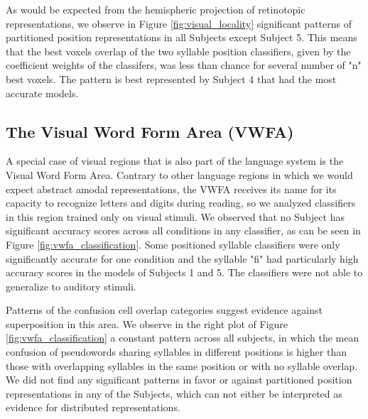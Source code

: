 As would be expected from the hemispheric projection of retinotopic representations, we observe in Figure \ref{fig:visual_locality} significant patterns of partitioned position representations in all Subjects except Subject 5.
This means that the best voxels overlap of the two syllable position classifiers, given by the coefficient weights of the classifers, was less than chance for several number of "n" best voxels.
The pattern is best represented by Subject 4 that had the most accurate models.


\subsection{The Visual Word Form Area (VWFA)}

A special case of visual regions that is also part of the language system is the Visual Word Form Area.
Contrary to other language regions in which we would expect abstract amodal representations, the VWFA receives its name for its capacity to recognize letters and digits during reading, so we analyzed classifiers in this region trained only on visual stimuli.
We observed that no Subject has significant accuracy scores across all conditions in any classifier, as can be seen in Figure \ref{fig:vwfa_classification}.
Some positioned syllable classifiers were only significantly accurate for one condition and the syllable "fi" had particularly high accuracy scores in the models of Subjects 1 and 5.
The classifiers were not able to generalize to auditory stimuli.

Patterns of the confusion cell overlap categories suggest evidence against superposition in this area.
We observe in the right plot of Figure \ref{fig:vwfa_classification} a constant pattern across all subjects, in which the mean confusion of pseudowords sharing syllables in different positions is higher than those with overlapping syllables in the same position or with no syllable overlap.
We did not find any significant patterns in favor or against partitioned position representations in any of the Subjects, which can not either be interpreted as evidence for distributed representations.


